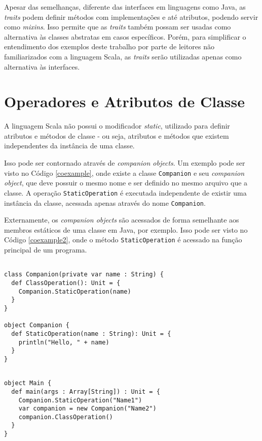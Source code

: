 Apesar das semelhanças, diferente das interfaces em 
linguagens como Java, as \textit{traits} podem definir métodos 
com implementações e até atributos, podendo servir 
como \textit{mixins}\cite{wampler2021}. Isso permite que 
as \textit{traits} também possam ser usadas como alternativa 
às classes abstratas em casos específicos. Porém, para 
simplificar o entendimento dos exemplos deste 
trabalho por parte de leitores não familiarizados 
com a linguagem Scala, as \textit{traits} serão utilizadas 
apenas como alternativa às interfaces.


\section{Operadores e Atributos de Classe}

A linguagem Scala não possui o modificador \textit{static}, 
utilizado para definir atributos e métodos de classe - 
ou seja, atributos e métodos que existem independentes 
da instância de uma classe. 

Isso pode ser contornado através de \textit{companion objects}. 
Um exemplo pode ser visto no Código \ref{coexample}, onde 
existe a classe \texttt{Companion} e seu \textit{companion object}, que 
deve possuir o mesmo nome e ser definido no mesmo arquivo 
que a classe. A operação \texttt{StaticOperation} é executada 
independente de existir uma instância da classe, acessada 
apenas através do nome \texttt{Companion}.

Externamente, os \textit{companion objects} são acessados 
de forma semelhante aos membros estáticos de uma classe 
em Java, por exemplo. Isso pode ser visto no Código 
\ref{coexample2}, onde o método \texttt{StaticOperation} é acessado 
na função principal de um programa.

\begin{lstlisting}[caption={Exemplo de \textit{companion object}.},label=coexample]

class Companion(private var name : String) {
  def ClassOperation(): Unit = {
    Companion.StaticOperation(name)
  }
}

object Companion {
  def StaticOperation(name : String): Unit = {
    println("Hello, " + name)
  }
}

\end{lstlisting}

\begin{lstlisting}[caption={Chamada de operações de um \textit{companion object}.},label=coexample2]

object Main {
  def main(args : Array[String]) : Unit = {
    Companion.StaticOperation("Name1")
    var companion = new Companion("Name2")
    companion.ClassOperation()
  }
}

\end{lstlisting}

